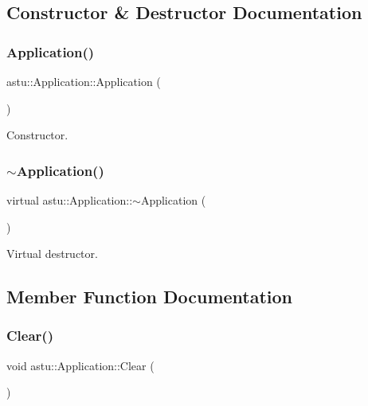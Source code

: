 \subsection{Constructor \& Destructor Documentation}
\mbox{\label{classastu_1_1Application_a8fd6025d4412ece9dc752a4a988f833f}} 
\subsubsection{\texorpdfstring{Application()}{Application()}}
{\footnotesize\ttfamily astu\+::\+Application\+::\+Application (\begin{DoxyParamCaption}{ }\end{DoxyParamCaption})}

Constructor. \mbox{\label{classastu_1_1Application_a9f165c3c8eba9eb7e09949aab426d653}} 
\subsubsection{\texorpdfstring{$\sim$\+Application()}{~Application()}}
{\footnotesize\ttfamily virtual astu\+::\+Application\+::$\sim$\+Application (\begin{DoxyParamCaption}{ }\end{DoxyParamCaption})\hspace{0.3cm}{\ttfamily [virtual]}}

Virtual destructor. 

\subsection{Member Function Documentation}
\mbox{\label{classastu_1_1Application_ae9d3de234f6abde882816e9866bd07bc}} 
\subsubsection{\texorpdfstring{Clear()}{Clear()}}
{\footnotesize\ttfamily void astu\+::\+Application\+::\+Clear (\begin{DoxyParamCaption}{ }\end{DoxyParamCaption})}

